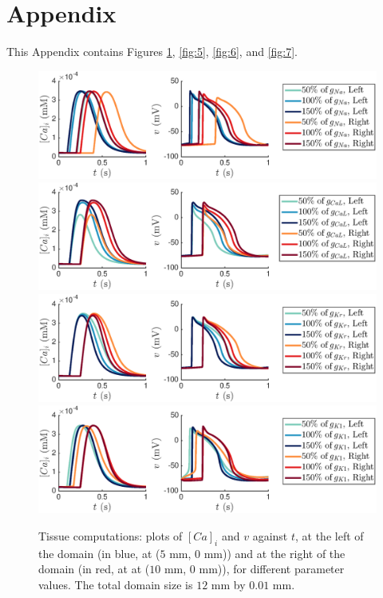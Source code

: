 \documentclass{article}
\begin{document}
\section*{Appendix} \label{Appendix}
%
This Appendix contains Figures \ref{fig:4}, \ref{fig:5}, \ref{fig:6}, and \ref{fig:7}.
\begin{figure}
   \includegraphics[trim=3cm 0cm 4cm 0cm, clip=true, width=1\linewidth]{strip_gna} 
   \includegraphics[trim=3cm 0cm 4cm 0cm, clip=true, width=1\linewidth]{strip_gcal} 
      \includegraphics[trim=3cm 0cm 4cm 0cm, clip=true, width=1\linewidth]{strip_gkr} 
         \includegraphics[trim=3cm 0cm 4cm 0cm, clip=true, width=1\linewidth]{strip_gk1} 
    \caption{Tissue computations: plots of $[Ca]_i$ and $v$ against $t$, at the left of the domain (in blue, at ($5$ mm, $0$ mm)) and at the right of the domain (in red, at at ($10$ mm, $0$ mm)), for different parameter values. The total domain size is $12$ mm by $0.01$ mm.}
    \label{fig:4}
\end{figure}
\end{document}
